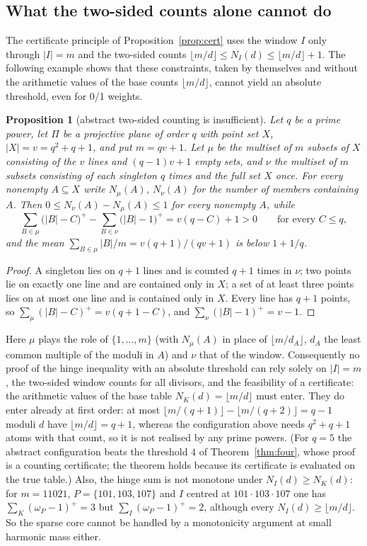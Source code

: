 \documentclass[11pt]{article}
\newtheorem{proposition}[theorem]{Proposition}
\theoremstyle{definition}
\begin{document}
\subsection*{What the two-sided counts alone cannot do}

The certificate principle of Proposition~\ref{prop:cert} uses the window $I$ only through $|I|=m$ and the two-sided counts
$\lfloor m/d\rfloor\le N_I(d)\le\lfloor m/d\rfloor+1$. The following example shows that these constraints, taken by themselves and
without the arithmetic values of the base counts $\lfloor m/d\rfloor$, cannot yield an absolute threshold, even for 0/1 weights.

\begin{proposition}[abstract two-sided counting is insufficient]\label{prop:fano}
Let $q$ be a prime power, let $\Pi$ be a projective plane of order $q$ with point set $X$, $|X|=v=q^2+q+1$, and put $m=qv+1$.
Let $\mu$ be the multiset of $m$ subsets of $X$ consisting of the $v$ lines and $(q-1)v+1$ empty sets, and $\nu$ the multiset of
$m$ subsets consisting of each singleton $q$ times and the full set $X$ once. For every nonempty $A\subseteq X$ write
$N_\mu(A)$, $N_\nu(A)$ for the number of members containing $A$. Then $0\le N_\nu(A)-N_\mu(A)\le1$ for every nonempty $A$, while
\[
\sum_{B\in\mu}\bigl(|B|-C\bigr)^+-\sum_{B\in\nu}\bigl(|B|-1\bigr)^+=v(q-C)+1>0\qquad\text{for every }C\le q ,
\]
and the mean $\sum_{B\in\mu}|B|/m=v(q+1)/(qv+1)$ is below $1+1/q$.
\end{proposition}
\begin{proof}
A singleton lies on $q+1$ lines and is counted $q+1$ times in $\nu$; two points lie on exactly one line and are contained only
in $X$; a set of at least three points lies on at most one line and is contained only in $X$. Every line has $q+1$ points, so
$\sum_\mu(|B|-C)^+=v(q+1-C)$, and $\sum_\nu(|B|-1)^+=v-1$.
\end{proof}

Here $\mu$ plays the role of $\{1,\dots,m\}$ (with $N_\mu(A)$ in place of $\lfloor m/d_A\rfloor$, $d_A$ the least common multiple of the
moduli in $A$) and $\nu$ that of the window. Consequently no proof of the hinge inequality with an absolute threshold can rely solely on
$|I|=m$, the two-sided window counts for all divisors, and the feasibility of a certificate: the arithmetic values of the base table
$N_K(d)=\lfloor m/d\rfloor$ must enter. They do enter already at first order: at most $\lfloor m/(q+1)\rfloor-\lfloor m/(q+2)\rfloor=q-1$
moduli $d$ have $\lfloor m/d\rfloor=q+1$, whereas the configuration above needs $q^2+q+1$ atoms with that count, so it is not realised
by any prime powers. (For $q=5$ the abstract configuration beats the threshold $4$ of Theorem~\ref{thm:four}, whose proof is a
counting certificate; the theorem holds because its certificate is evaluated on the true table.) Also, the hinge sum is not monotone
under $N_I(d)\ge N_K(d)$: for $m=11021$, $P=\{101,103,107\}$ and $I$ centred at $101\cdot103\cdot107$ one has $\sum_K(\omega_P-1)^+=3$
but $\sum_I(\omega_P-1)^+=2$, although every $N_I(d)\ge\lfloor m/d\rfloor$. So the sparse core cannot be handled by a monotonicity
argument at small harmonic mass either.
\end{document}
